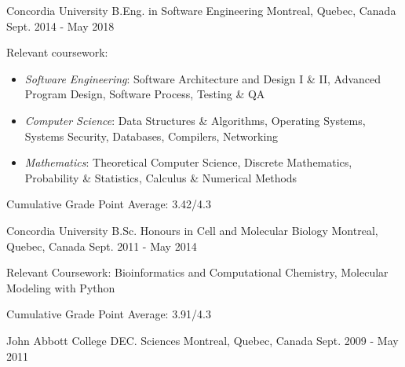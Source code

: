 

\begin{cventries}

  \cventry
  {\small Concordia University} %
  {\normalsize B.Eng. in Software Engineering} %
  {\small Montreal, Quebec, Canada} %
  {\small Sept. 2014 - May 2018} %
  {
    \begin{cvitems} %
    \item {\small Relevant coursework:}
      \begin{itemize}
        \item \small \textit{Software Engineering}: Software Architecture and Design I \& II, Advanced Program Design, Software Process, Testing \& QA
        \item \small \textit{Computer Science}: Data Structures \& Algorithms, Operating Systems, Systems Security, Databases, Compilers, Networking
        \item \small \textit{Mathematics}: Theoretical Computer Science, Discrete Mathematics, Probability \& Statistics, Calculus \& Numerical Methods
    \end{itemize}
  \item {\small Cumulative Grade Point Average: 3.42/4.3}
    \end{cvitems}
  }

  \cventry
  {\small Concordia University} %
  {\normalsize B.Sc. Honours in Cell and Molecular Biology} %
  {\small Montreal, Quebec, Canada} %
  {\small Sept. 2011 - May 2014} %
  {
    \begin{cvitems} %
    \item {\small Relevant Coursework: Bioinformatics and Computational Chemistry, Molecular Modeling with Python }
    \item {\small Cumulative Grade Point Average: 3.91/4.3}
    \end{cvitems}
  }

  \cventry
  {\small John Abbott College} %
  {\normalsize DEC. Sciences} %
  {\small Montreal, Quebec, Canada} %
  {\small Sept. 2009 - May 2011} %
  {
  }

  \vspace{-3mm}

\end{cventries}
